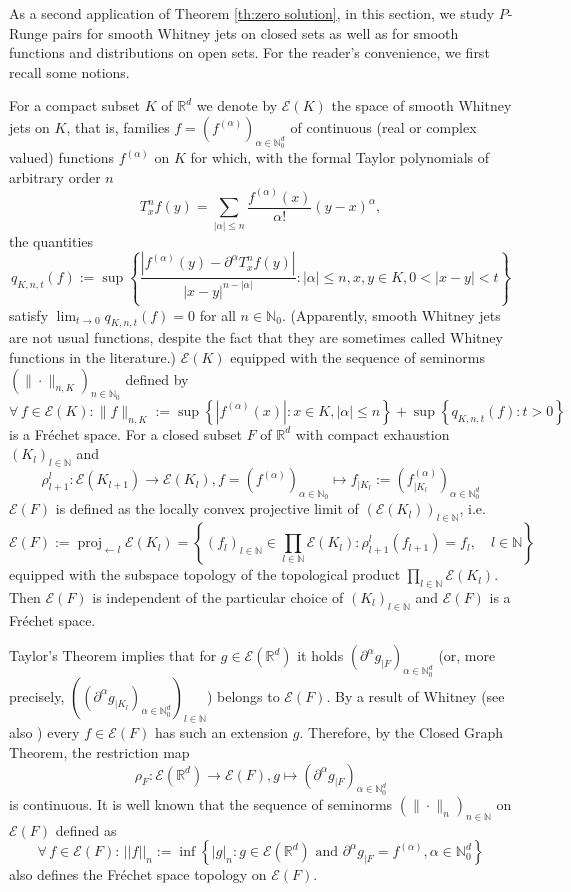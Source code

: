 \documentclass[a4paper,10pt]{amsart}
\newtheorem*{crucial lemma}{Lemma \ref{lem:nice polynomial2}}
\theoremstyle{definition}
\newcommand{\R}{\mathbb{R}}
\newcommand{\N}{\mathbb{N}}
\begin{document}
As a second application of Theorem \ref{th:zero solution}, in this section, we study $P$-Runge pairs for smooth Whitney jets on closed sets as well as for smooth functions and distributions on open sets. For the reader's convenience, we first recall some notions.

For a compact subset $K$ of $\R^d$ we denote by $\mathscr{E}(K)$ the space of smooth Whitney jets on $K$, that is, families $f=(f^{(\alpha)})_{\alpha\in\N_0^d}$ of continuous (real or complex valued) functions $f^{(\alpha)}$ on $K$ for which, with the formal Taylor polynomials of arbitrary order $n$
$$T^n_xf(y)=\sum_{|\alpha|\leq n}\frac{f^{(\alpha)}(x)}{\alpha!}(y-x)^\alpha,$$
the quantities
$$q_{K,n,t}(f):=\sup\left\{\frac{|f^{(\alpha)}(y)-\partial^\alpha T_x^nf(y)|}{|x-y|^{n-|\alpha|}}\colon |\alpha|\leq n, x,y\in K, 0<|x-y|<t\right\}$$
satisfy $\lim_{t\rightarrow 0}q_{K,n,t}(f)=0$ for all $n\in\N_0$. (Apparently, smooth Whitney jets are not usual functions, despite the fact that they are sometimes called Whitney functions in the literature.) $\mathscr{E}(K)$ equipped with the sequence of seminorms $(\|\cdot\|_{n,K})_{n\in\N_0}$ defined by
$$\forall\,f\in\mathscr{E}(K)\colon \|f\|_{n,K}:=\sup\left\{|f^{(\alpha)}(x)|\colon x\in K, |\alpha|\leq n\right\}+\sup\left\{q_{K,n,t}(f)\colon t>0\right\}$$
is a Fr\'echet space. For a closed subset $F$ of $\R^d$ with compact exhaustion $(K_l)_{l\in\N}$ and
$$\rho_{l+1}^l:\mathscr{E}(K_{l+1})\rightarrow\mathscr{E}(K_l), f=(f^{(\alpha)})_{\alpha\in\N_0}\mapsto f_{\mid K_l}:=(f^{(\alpha)}_{\mid K_l})_{\alpha\in\N_0^d}$$
$\mathscr{E}(F)$ is defined as the locally convex projective limit of $(\mathscr{E}(K_l))_{l\in\N}$, i.e.\ 
$$\mathscr{E}(F):=\operatorname{proj}_{\leftarrow l}\mathscr{E}(K_l)=\left\{(f_l)_{l\in\N}\in\prod_{l\in\N}\mathscr{E}(K_l)\colon \rho_{l+1}^l(f_{l+1})=f_l,\quad l\in\N\right\}$$
equipped with the subspace topology of the topological product $\prod_{l\in\N}\mathscr{E}(K_l)$. Then $\mathscr{E}(F)$ is independent of the particular choice of $(K_l)_{l\in\N}$ and $\mathscr{E}(F)$ is a Fr\'echet space.

Taylor's Theorem implies that for $g\in\mathscr{E}(\R^d)$ it holds $(\partial^\alpha g_{\mid F})_{\alpha\in\N_0^d}$ (or, more precisely, $\left(\left(\partial^{\alpha}g_{\mid K_l}\right)_{\alpha\in\N_0^d}\right)_{l\in\N}$) belongs to $\mathscr{E}(F)$. By a result of Whitney \cite{Whitney34} (see also \cite{Malgrange1967}) every $f\in\mathscr{E}(F)$ has such an extension $g$. Therefore, by the Closed Graph Theorem, the restriction map $$\rho_F\colon\mathscr{E}(\R^d)\rightarrow\mathscr{E}(F), g\mapsto (\partial^\alpha g_{\mid F})_{\alpha\in\N_0^d}$$
is continuous. It is well known that the sequence of seminorms $(\|\cdot\|_n)_{n\in\N}$ on $\mathscr{E}(F)$ defined as
$$\forall\,f\in\mathscr{E}(F)\colon\,||f||_n:=\inf\left\{|g|_{n}\colon g\in\mathscr{E}(\R^d)  \text{ and } \partial^\alpha g_{\mid{F}}=f^{(\alpha)}, \alpha\in\N_0^d\right\}$$
also defines the Fr\'echet space topology on $\mathscr{E}(F)$. 
\end{document}
